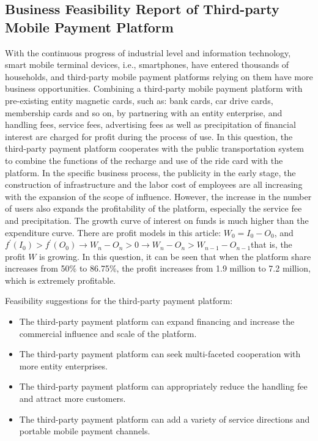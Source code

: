 \documentclass[../mcmpaper]{subfiles}
\begin{document}
\subsection{Business Feasibility Report of Third-party Mobile Payment Platform}
With the continuous progress of industrial level and information technology, smart mobile terminal devices, i.e., smartphones, have entered thousands of households, and third-party mobile payment platforms relying on them have more business opportunities. Combining a third-party mobile payment platform with pre-existing entity magnetic cards, such as: bank cards, car drive cards, membership cards and so on, by partnering with an entity enterprise, and handling fees, service fees, advertising fees as well as precipitation of financial interest are charged for profit during the process of use.
In this question, the third-party payment platform cooperates with the public transportation system to combine the functions of the recharge and use of the ride card with the platform. In the specific business process, the publicity in the early stage, the construction of infrastructure and the labor cost of employees are all increasing with the expansion of the scope of influence. However, the increase in the number of users also expands the profitability of the platform, especially the service fee and precipitation. The growth curve of interest on funds is much higher than the expenditure curve. There are profit models in this article: $W_{0}=I_{0}-O_{0}$, and $f^{\prime}\left(I_{0}\right)>f^{\prime}\left(O_{0}\right) \rightarrow W_{n}-O_{n}>0 \rightarrow W_{n}-O_{n}>W_{n-1}-O_{n-1}$that is, the profit $W$ is growing. In this question, it can be seen that when the platform share increases from 50\% to 86.75\%, the profit increases from 1.9 million to 7.2 million, which is extremely profitable.
\par
Feasibility suggestions for the third-party payment platform:
\begin{itemize}
    \item The third-party payment platform can expand financing and increase the commercial influence and scale of the platform. 
    \item The third-party payment platform can seek multi-faceted cooperation with more entity enterprises.
    \item The third-party payment platform can appropriately reduce the handling fee and attract more customers. 
    \item The third-party payment platform can add a variety of service directions and portable mobile payment channels.
\end{itemize}
\end{document}

